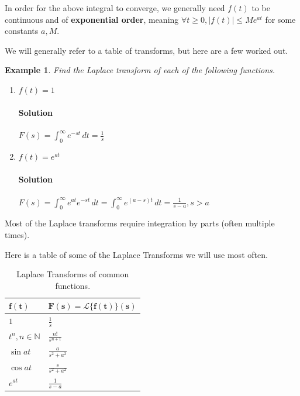 \documentclass[letterpaper, 11pt, openany]{book}
\theoremstyle{mytheoremstyle}
\theoremstyle{myexamplestyle}
\newtheorem{example}{Example}[section]
\newenvironment{solution}{\paragraph{\sffamily \smaller \fontseries{b}\selectfont Solution}}{\hfill\faSquare}
\begin{document}
In order for the above integral to converge, we generally need \(f(t)\) to be continuous and of \textbf{exponential order}, meaning \(\forall t \geq 0, |f(t)| \leq M e^{at} \) for some constants \(a, M\).

We will generally refer to a table of transforms, but here are a few worked out.

\begin{example}
    Find the Laplace transform of each of the following functions.
    \begin{enumerate}
        \item \(f(t) = 1\)
        \begin{solution}
            \(\displaystyle F(s) = \int_0^\infty e^{-st} \, dt = \frac{1}{s} \)
        \end{solution}
        \item \(f(t) = e^{at}\)
        \begin{solution}
            \(\displaystyle F(s) = \int_0^\infty e^{at}e^{-st} \, dt = \int_0^\infty e^{(a-s)t} \, dt = \frac{1}{s - a}, s > a\)
        \end{solution}
    \end{enumerate}
\end{example}

Most of the Laplace transforms require integration by parts (often multiple times).

Here is a table of some of the Laplace Transforms we will use most often.

\begin{table}[htbp]
    \centering
    \begin{tabular}{ll}
        $\boldsymbol{f(t)}$				& 	$\boldsymbol{F(s) = \mathcal{L}\{f(t)\}(s)}$ \rule[-0.9ex]{0pt}{0pt} \\
        \hline
        $1$								&	$\displaystyle \frac{1}{s}$ \rule{0pt}{3.6ex} \\[12pt] 
	    $t^n,n\in \mathbb{N}$			&	$\displaystyle \frac{n!}{s^{n+1}}$ \\[12pt]
	    $\sin{at}$						&	$\displaystyle \frac{a}{s^2 + a^2}$ \\[12pt] 
	    $\cos{at}$						&	$\displaystyle \frac{s}{s^2 + a^2}$ \\[12pt] 
	    $e^{at}$						&	$\displaystyle \frac{1}{s-a}$ \\[12pt]
    \end{tabular}
    \caption{Laplace Transforms of common functions.}
    \label{t:common-laplace-xforms}
\end{table}
\end{document}

